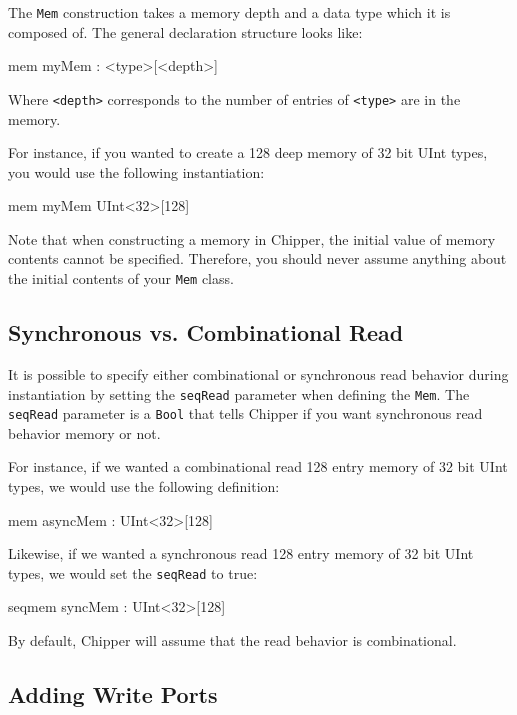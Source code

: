The \verb+Mem+ construction takes a memory depth and a data type which it is composed of. The general declaration structure looks like:

\begin{stanza}
mem myMem : <type>[<depth>]
\end{stanza}

Where \verb+<depth>+ corresponds to the number of entries of \verb+<type>+ are in the memory.

For instance, if you wanted to create a 128 deep memory of 32 bit UInt types, you would use the following instantiation:

\begin{stanza}
mem myMem UInt<32>[128]
\end{stanza}

Note that when constructing a memory in Chipper, the initial value of memory contents cannot be specified. Therefore, you should never assume anything about the initial contents of your \verb+Mem+ class.

\subsection{Synchronous vs. Combinational Read}

It is possible to specify either combinational or synchronous read behavior during instantiation by setting the \verb+seqRead+ parameter when defining the \verb+Mem+. The \verb+seqRead+ parameter is a \verb+Bool+ that tells Chipper if you want synchronous read behavior memory or not.

For instance, if we wanted a combinational read 128 entry memory of 32 bit UInt types, we would use the following definition:

\begin{stanza}
mem asyncMem : UInt<32>[128]
\end{stanza}

Likewise, if we wanted a synchronous read 128 entry memory of 32 bit UInt types, we would set the \verb+seqRead+ to true:

\begin{stanza}
seqmem syncMem : UInt<32>[128]
\end{stanza}


By default, Chipper will assume that the read behavior is combinational.

\subsection{Adding Write Ports}

